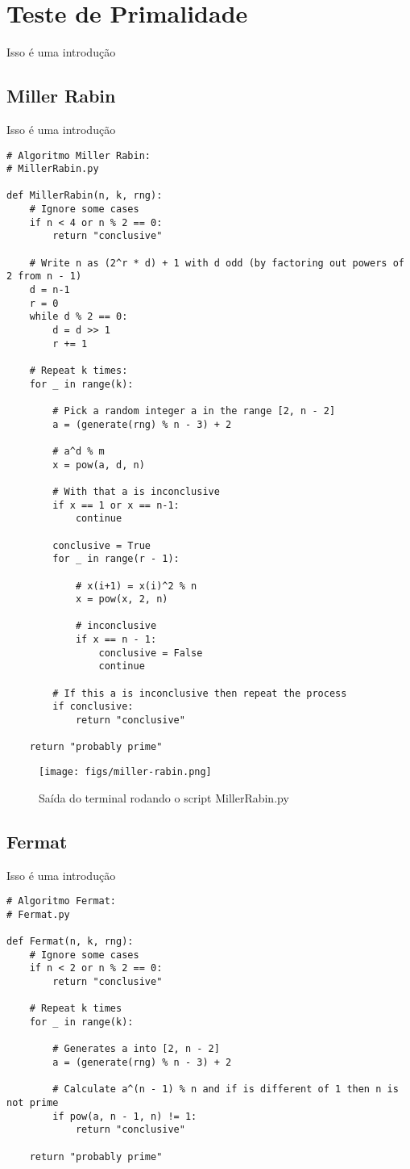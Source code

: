 \documentclass{article}
\begin{document}
\section{Teste de Primalidade}
\label{sec:prime}

Isso é uma introdução

\subsection{Miller Rabin}

Isso é uma introdução

\begin{lstlisting}
# Algoritmo Miller Rabin:
# MillerRabin.py

def MillerRabin(n, k, rng):
	# Ignore some cases
	if n < 4 or n % 2 == 0:
		return "conclusive"

	# Write n as (2^r * d) + 1 with d odd (by factoring out powers of 2 from n - 1)
	d = n-1
	r = 0
	while d % 2 == 0:
		d = d >> 1
		r += 1

	# Repeat k times:
	for _ in range(k):
		
		# Pick a random integer a in the range [2, n - 2]
		a = (generate(rng) % n - 3) + 2

		# a^d % m
		x = pow(a, d, n)

		# With that a is inconclusive
		if x == 1 or x == n-1:
			continue

		conclusive = True
		for _ in range(r - 1):

			# x(i+1) = x(i)^2 % n
			x = pow(x, 2, n)

			# inconclusive
			if x == n - 1:
				conclusive = False
				continue
		
		# If this a is inconclusive then repeat the process
		if conclusive:
			return "conclusive"
	
	return "probably prime"
\end{lstlisting}

\begin{figure}[h!]
	\centering
	\texttt{[image: figs/miller-rabin.png]}
	\caption{Saída do terminal rodando o script MillerRabin.py}
	\label{fig:universe}
\end{figure}

\subsection{Fermat}

Isso é uma introdução

\begin{lstlisting}
# Algoritmo Fermat:
# Fermat.py

def Fermat(n, k, rng):
	# Ignore some cases
	if n < 2 or n % 2 == 0:
		return "conclusive"

	# Repeat k times
	for _ in range(k):

		# Generates a into [2, n - 2]
		a = (generate(rng) % n - 3) + 2

		# Calculate a^(n - 1) % n and if is different of 1 then n is not prime
		if pow(a, n - 1, n) != 1:
			return "conclusive"

	return "probably prime"
\end{lstlisting}
\end{document}
